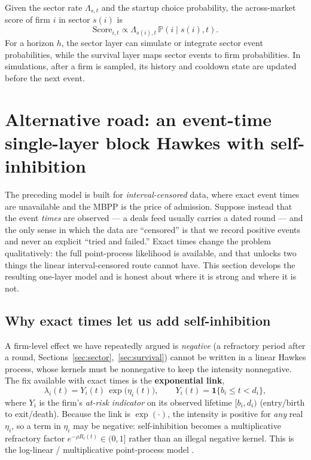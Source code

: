 \documentclass[11pt]{article}
\theoremstyle{plain}
\theoremstyle{definition}
\theoremstyle{remark}
\newcommand{\Prob}{\mathbb{P}}
\newcommand{\one}{\mathbf{1}}
\begin{document}
Given the sector rate $\Lambda_{s,t}$ and the startup choice probability, the across-market score of firm $i$ in sector $s(i)$ is
\begin{equation}
\mathrm{Score}_{i,t}\propto \Lambda_{s(i),t}\,\Prob(i\mid s(i),t).
\label{eq:marked_score}
\end{equation}
For a horizon $h$, the sector layer can simulate or integrate sector event probabilities, while the survival layer maps sector events to firm probabilities. In simulations, after a firm is sampled, its history and cooldown state are updated before the next event.

\section{Alternative road: an event-time single-layer block Hawkes with self-inhibition}
\label{sec:blockhawkes}

The preceding model is built for \emph{interval-censored} data, where exact event times are unavailable and the MBPP is the price of admission. Suppose instead that the event \emph{times} are observed --- a deals feed usually carries a dated round --- and the only sense in which the data are ``censored'' is that we record positive events and never an explicit ``tried and failed.'' Exact times change the problem qualitatively: the full point-process likelihood is available, and that unlocks two things the linear interval-censored route cannot have. This section develops the resulting one-layer model and is honest about where it is strong and where it is not.

\subsection{Why exact times let us add self-inhibition}
A firm-level effect we have repeatedly argued is \emph{negative} (a refractory period after a round, Sections~\ref{sec:sector},~\ref{sec:survival}) cannot be written in a linear Hawkes process, whose kernels must be nonnegative to keep the intensity nonnegative. The fix available with exact times is the \textbf{exponential link},
\begin{equation}
\lambda_i(t)=Y_i(t)\,\exp\!\big(\eta_i(t)\big),\qquad Y_i(t)=\one\{b_i\le t<d_i\},
\label{eq:bh_intensity}
\end{equation}
where $Y_i$ is the firm's \emph{at-risk indicator} on its observed lifetime $[b_i,d_i)$ (entry/birth to exit/death). Because the link is $\exp(\cdot)$, the intensity is positive for \emph{any} real $\eta_i$, so a term in $\eta_i$ may be negative: self-inhibition becomes a multiplicative refractory factor $e^{-\rho R_i(t)}\in(0,1]$ rather than an illegal negative kernel. This is the log-linear / multiplicative point-process model \citep{truccolo2005,bremaud1996}.
\end{document}
